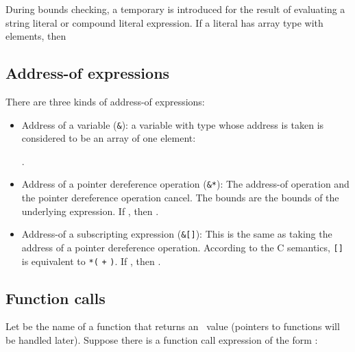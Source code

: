 During bounds checking, a temporary is introduced for the result
of evaluating a string literal or compound literal expression.
If a literal  has array type with  elements, then

\subsection{Address-of expressions}
\label{section:address-of-expression-bounds}

There are three kinds of address-of expressions:
\begin{itemize}
\item Address of a variable (\lstinline|&|): a variable  with type  
whose address is taken is considered to be an array of one element:

            {}.
            
\item Address of a pointer dereference operation (\lstinline|&*|):
The address-of operation and the pointer dereference operation cancel. 
The bounds are the bounds of the underlying expression. 
If , then
.

\item Address-of a subscripting expression (\lstinline|&|\lstinline|[|\lstinline|]|):
This is the same as taking the address of a pointer dereference operation.
According to the C semantics, \lstinline|[|\lstinline|]| is equivalent
to \lstinline|*(| \lstinline|+| \lstinline|)|.  If 
, then
.
\end{itemize}
   
\subsection{Function calls}
\label{section:inferring-bounds-for-function-calls}

Let  be the name of a function that returns an
\arrayptr\ value (pointers to functions will be handled later).
Suppose there is a function call expression of the form
\code{(}\code{)}:

